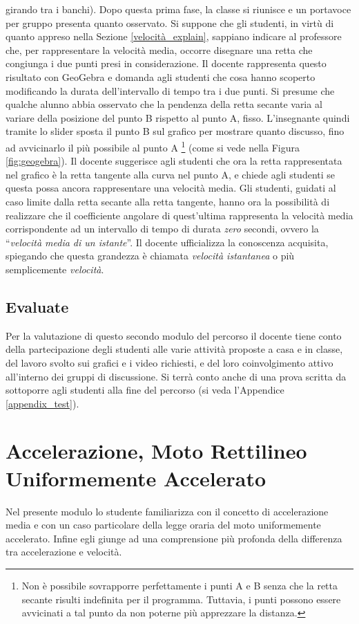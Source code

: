 \documentclass{report} \usepackage[T1]{fontenc} \usepackage[italian]{babel}
\begin{document}
girando tra i banchi). Dopo questa prima fase, la classe si riunisce e un
portavoce per gruppo presenta quanto osservato. Si suppone che gli studenti, in
virtù di quanto appreso nella Sezione \ref{velocità_explain}, sappiano indicare al professore che,
per rappresentare la velocità media, occorre disegnare una retta che congiunga
i due punti presi in considerazione. Il docente rappresenta questo
risultato con GeoGebra e domanda agli studenti che cosa hanno scoperto
modificando la durata dell'intervallo di tempo tra i due punti.
Si presume che qualche alunno abbia osservato
che la pendenza della retta secante varia al variare della posizione del punto
B rispetto al punto A, fisso. L’insegnante quindi tramite lo slider sposta il
punto B sul grafico per mostrare quanto discusso, fino ad avvicinarlo il più
possibile al punto A
\footnote{
          Non è possibile sovrapporre perfettamente i punti A e B senza che la retta secante
          risulti indefinita per il programma. Tuttavia, i punti possono
          essere avvicinati a tal punto da non poterne più apprezzare la
          distanza.
         }
(come si vede nella Figura \ref{fig:geogebra}).
Il docente suggerisce agli studenti che ora la retta rappresentata nel grafico
è la retta tangente alla curva nel punto A, e chiede agli studenti se questa possa
ancora rappresentare una velocità media. Gli studenti, guidati al caso limite dalla retta
secante alla retta tangente, hanno ora la possibilità di realizzare che il coefficiente
angolare di quest'ultima rappresenta la velocità media corrispondente ad un intervallo
di tempo di durata \emph{zero} secondi, ovvero la ``\emph{velocità media di un istante}''.
Il docente ufficializza la conoscenza acquisita, spiegando che questa grandezza è
chiamata \emph{velocità istantanea} o più semplicemente \emph{velocità}.

\section{Evaluate}
Per la valutazione di questo secondo modulo del percorso il docente tiene conto della
partecipazione degli studenti alle varie attività proposte a casa e in classe,
del lavoro svolto sui grafici e i video richiesti, e del loro coinvolgimento attivo
all’interno dei gruppi di discussione.
Si terrà conto anche di una prova scritta da sottoporre agli
studenti alla fine del percorso
(si veda l'Appendice \ref{appendix_test}).

\chapter{Accelerazione, Moto Rettilineo Uniformemente Accelerato}\label{accelerazione}
Nel presente modulo lo studente familiarizza con il concetto di accelerazione
media e con un caso particolare della legge oraria del moto uniformemente accelerato.
Infine egli giunge ad una comprensione più profonda della differenza
tra accelerazione e velocità.
\end{document}

